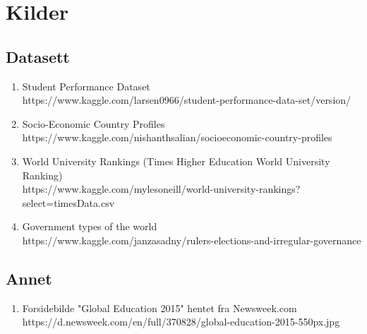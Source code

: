 \section{Kilder}
\subsection{Datasett}
\begin{enumerate}
  \item Student Performance Dataset \\
  https://www.kaggle.com/larsen0966/student-performance-data-set/version/
  \item Socio-Economic Country Profiles \\
  https://www.kaggle.com/nishanthsalian/socioeconomic-country-profiles
  \item World University Rankings (Times Higher Education World University Ranking) \\
  https://www.kaggle.com/mylesoneill/world-university-rankings?select=timesData.csv
  \item Government types of the world \\
  https://www.kaggle.com/janzasadny/rulers-elections-and-irregular-governance
\end{enumerate}

\subsection{Annet}
\begin{enumerate}
  \item Forsidebilde "Global Education 2015" hentet fra Newsweek.com \\
  https://d.newsweek.com/en/full/370828/global-education-2015-550px.jpg
\end{enumerate}

